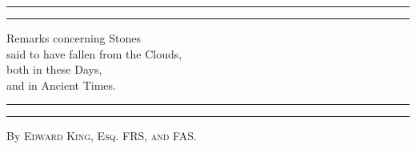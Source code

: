 \documentclass[a4paper, 12pt, oneside, twocolumn]{article}
\begin{document}
\begin{titlepage} %
	\centering %
	\scshape %

	
	\rule{\textwidth}{1.6pt}\vspace*{-\baselineskip}\vspace*{2pt} %
	\rule{\textwidth}{0.4pt} %
	
	\vspace{0.75\baselineskip} %

        {\LARGE Remarks concerning Stones\\ said to have fallen from the Clouds,\\ both in these Days,\\ and in Ancient Times. \\} %
	
	\vspace{0.75\baselineskip} %
	
	\rule{\textwidth}{0.4pt}\vspace*{-\baselineskip}\vspace{3.2pt} %
	\rule{\textwidth}{1.6pt} %
	
	\vspace{1\baselineskip} %
	
	
	{By \scshape\Large Edward King, Esq. FRS, and FAS.\\} %
	
	\vspace*{1\baselineskip} %
	
	
	\vspace{1\baselineskip} %

	

\end{titlepage}
\end{document}

